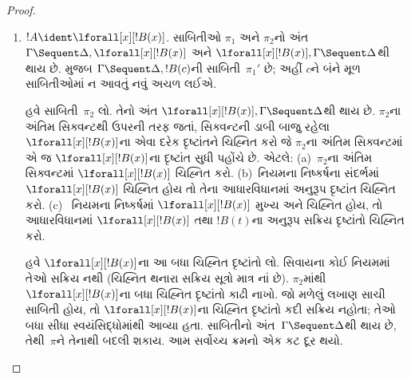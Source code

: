 \begin{proof}
\begin{enumerate}
  લગાવતાં $!C, !B, \Gamma \Sequent \Delta$ની
  સાબિતી~$\pi_2'''$ પણ મળે છે.
  સાબિતી~$\pi'$ આ છે:
  \[
  \AxiomC{}
  \RightLabel{$\pi_2'$}
  \Deduce$\Gamma \fCenter \Delta, !B$
  \AxiomC{}
  \RightLabel{$\pi_1'$}
  \Deduce$!B, \Gamma \fCenter \Delta, !C$
  \AxiomC{}
  \RightLabel{$\pi_2'''$}
  \Deduce$!C, !B, \Gamma \fCenter \Delta$
  \RightLabel{\CutCS}
  \BinaryInf$!B, \Gamma \fCenter \Delta$
  \RightLabel{\CutCS}
  \BinaryInf$\Gamma \fCenter \Delta$
  \DisplayProof
  \]
  \item $!A \ident \lforall[x][!B(x)]$. સાબિતીઓ $\pi_1$ અને
  $\pi_2$નો અંત $\Gamma \Sequent \Delta, \lforall[x][!B(x)]$
  અને $\lforall[x][!B(x)], \Gamma \Sequent \Delta$થી થાય છે.
   મુજબ
  $\Gamma \Sequent \Delta, !B(c)$ની
  સાબિતી~$\pi_1'$ છે; અહીં $c$ને બંને મૂળ
  સાબિતીઓમાં ન આવતું નવું અચળ લઈએ.

  હવે સાબિતી~$\pi_2$ લો. તેનો અંત
  $\lforall[x][!B(x)], \Gamma \Sequent \Delta$થી
  થાય છે. $\pi_2$ના અંતિમ સિક્વન્ટથી ઉપરની તરફ
  જતાં, સિક્વન્ટની ડાબી બાજુ રહેલા
  $\lforall[x][!B(x)]$ના એવા દરેક દૃષ્ટાંતને
  ચિહ્નિત કરો જે $\pi_2$ના અંતિમ સિક્વન્ટમાં
  એ જ $\lforall[x][!B(x)]$ના દૃષ્ટાંત સુધી પહોંચે છે. એટલે:
  (a)~$\pi_2$ના અંતિમ સિક્વન્ટમાં
  $\lforall[x][!B(x)]$ ચિહ્નિત કરો.
  (b)~નિયમના નિષ્કર્ષના સંદર્ભમાં
  $\lforall[x][!B(x)]$
  ચિહ્નિત હોય તો તેના આધારવિધાનમાં અનુરૂપ
  દૃષ્ટાંત ચિહ્નિત કરો. (c)~\LeftR{\lforall}
  નિયમના નિષ્કર્ષમાં $\lforall[x][!B(x)]$
  મુખ્ય અને ચિહ્નિત હોય, તો આધારવિધાનમાં
  $\lforall[x][!B(x)]$ તથા $!B(t)$ના
  અનુરૂપ સક્રિય દૃષ્ટાંતો ચિહ્નિત કરો.
  
  હવે $\lforall[x][!B(x)]$ના આ બધા
  ચિહ્નિત દૃષ્ટાંતો લો. \LeftR{\lforall}
  સિવાયના કોઈ નિયમમાં તેઓ સક્રિય નથી
  (ચિહ્નિત થનારા સક્રિય સૂત્રો
  માત્ર \LeftR{\lforall}નાં છે).
  $\pi_2$માંથી $\lforall[x][!B(x)]$ના
  બધા ચિહ્નિત દૃષ્ટાંતો કાઢી નાખો.
  જો મળેલું લખાણ સાચી સાબિતી હોય,
  તો $\lforall[x][!B(x)]$ના ચિહ્નિત
  દૃષ્ટાંતો કદી સક્રિય નહોતા;
  તેઓ બધા સીધા સ્વયંસિદ્ધોમાંથી આવ્યા હતા.
  સાબિતીનો અંત~$\Gamma \Sequent \Delta$થી
  થાય છે, તેથી~$\pi$ને તેનાથી બદલી શકાય.
  આમ સર્વોચ્ચ ક્રમનો એક કટ દૂર થયો.


\end{enumerate}
\end{proof}
